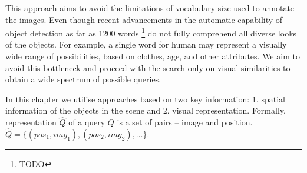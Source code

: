 





This approach aims to avoid the limitations of vocabulary size used to annotate the images. Even though recent advancements in the automatic capability of object detection as far as 1200 words \footnote{TODO} do not fully comprehend all diverse looks of the objects. For example, a single word for human may represent a visually wide range of possibilities, based on clothes, age, and other attributes. We aim to avoid this bottleneck and proceed with the search only on visual similarities to obtain a wide spectrum of possible queries.

In this chapter we utilise approaches based on two key information: 1. spatial information of the objects in the scene and 2. visual representation. Formally, representation $\hat{Q}$ of a query $Q$ is a set of pairs -- image and position. $\hat{Q} = \{ (pos_1, img_1), (pos_2, img_2), \dots \}$.

